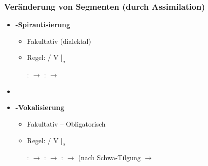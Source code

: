 \begin{frame}
\frametitle{Veränderung von Segmenten (durch Assimilation)}

\begin{itemize}
	\item \textbf{-Spirantisierung}

	\begin{itemize}
		\item Fakultativ (dialektal)
		\item Regel:  \ras {} / V\underline{\quad} $]_\sigma$

\eal	
	\ex {}:  $\rightarrow$ \textipa{[za:xst]}
	\ex {}:  $\rightarrow$ \textipa{[f{\textscr}\t{OI}.dI\c{c}]}
\zl

	\end{itemize}

	\item[]
	\item \textbf{\textipa{/{\textscr}/}-Vokalisierung}
	
	\begin{itemize}
		\item Fakultativ -- Obligatorisch
		\item Regel: \textipa{/{\textscr}/} \ras \textipa{[5]} / V\underline{\quad} $]_\sigma$

	\eal
		\ex {}:  $\rightarrow$ \textipa{[Po:5]}
		\ex {}:  $\rightarrow$ \textipa{[fE5n]}
		\ex {}:  $\rightarrow$ \textipa{[le:.{\textscr}@5]} (nach Schwa-Tilgung $\rightarrow$ \textipa{[le:.{\textscr}5]}
	\zl
	
	\end{itemize}

\end{itemize}

\end{frame}




